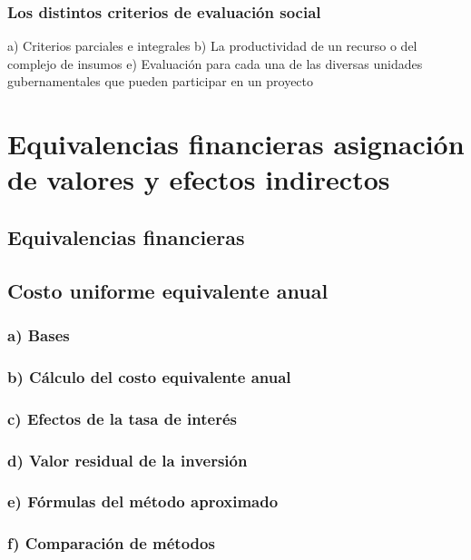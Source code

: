 \documentclass[crop=false]{standalone}
\begin{document}
\subsubsection{Los distintos criterios de evaluación social}

a) Criterios parciales e integrales
b) La productividad de un recurso o del complejo de insumos
e) Evaluación para cada una de las diversas unidades gubernamentales que pueden participar en
un proyecto


\section{Equivalencias financieras asignación de valores y efectos indirectos}


\subsection{Equivalencias financieras}

\subsection{ Costo uniforme equivalente anual}

\subsubsection{}
\subsubsection{a) Bases}
\subsubsection{b) Cálculo del costo equivalente anual}
\subsubsection{c) Efectos de la tasa de interés}
\subsubsection{d) Valor residual de la inversión}
\subsubsection{e) Fórmulas del método aproximado}
\subsubsection{f) Comparación de métodos}
\end{document}
